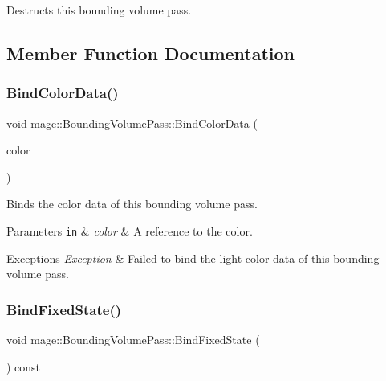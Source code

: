 Destructs this bounding volume pass. 

\subsection{Member Function Documentation}
\hypertarget{classmage_1_1_bounding_volume_pass_a29a98f857f8ae45a0230b96f78f2dcb9}{}\label{classmage_1_1_bounding_volume_pass_a29a98f857f8ae45a0230b96f78f2dcb9} 
\subsubsection{\texorpdfstring{Bind\+Color\+Data()}{BindColorData()}}
{\footnotesize\ttfamily void mage\+::\+Bounding\+Volume\+Pass\+::\+Bind\+Color\+Data (\begin{DoxyParamCaption}\item[{const \hyperlink{structmage_1_1_r_g_b_a}{R\+G\+BA} \&}]{color }\end{DoxyParamCaption})\hspace{0.3cm}{\ttfamily [private]}}

Binds the color data of this bounding volume pass.


\begin{DoxyParams}[1]{Parameters}
\mbox{\tt in}  & {\em color} & A reference to the color. \\
\hline
\end{DoxyParams}

\begin{DoxyExceptions}{Exceptions}
{\em \hyperlink{classmage_1_1_exception}{Exception}} & Failed to bind the light color data of this bounding volume pass. \\
\hline
\end{DoxyExceptions}
\hypertarget{classmage_1_1_bounding_volume_pass_ab38a107beb5481e923526d51e9fdfbe2}{}\label{classmage_1_1_bounding_volume_pass_ab38a107beb5481e923526d51e9fdfbe2} 
\subsubsection{\texorpdfstring{Bind\+Fixed\+State()}{BindFixedState()}}
{\footnotesize\ttfamily void mage\+::\+Bounding\+Volume\+Pass\+::\+Bind\+Fixed\+State (\begin{DoxyParamCaption}{ }\end{DoxyParamCaption}) const\hspace{0.3cm}{\ttfamily [noexcept]}}

